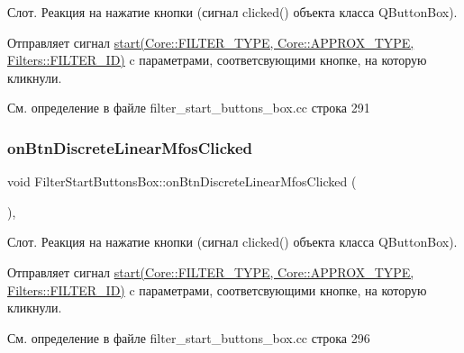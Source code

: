 Слот. Реакция на нажатие кнопки (сигнал clicked() объекта класса Q\+Button\+Box).

Отправляет сигнал \hyperlink{class_filter_start_buttons_box_ac6e2a6555f1d388391f188f834b8e753}{start(\+Core\+::\+F\+I\+L\+T\+E\+R\+\_\+\+T\+Y\+P\+E, Core\+::\+A\+P\+P\+R\+O\+X\+\_\+\+T\+Y\+P\+E, Filters\+::\+F\+I\+L\+T\+E\+R\+\_\+\+I\+D)} c параметрами, соответсвующими кнопке, на которую кликнули. 

См. определение в файле filter\+\_\+start\+\_\+buttons\+\_\+box.\+cc строка 291

\hypertarget{class_filter_start_buttons_box_ac200f7d204677620288463458a0d5dea}{}\label{class_filter_start_buttons_box_ac200f7d204677620288463458a0d5dea} 
\subsubsection{\texorpdfstring{on\+Btn\+Discrete\+Linear\+Mfos\+Clicked}{onBtnDiscreteLinearMfosClicked}}
{\footnotesize\ttfamily void Filter\+Start\+Buttons\+Box\+::on\+Btn\+Discrete\+Linear\+Mfos\+Clicked (\begin{DoxyParamCaption}{ }\end{DoxyParamCaption})\hspace{0.3cm}{\ttfamily [private]}, {\ttfamily [slot]}}

Слот. Реакция на нажатие кнопки (сигнал clicked() объекта класса Q\+Button\+Box).

Отправляет сигнал \hyperlink{class_filter_start_buttons_box_ac6e2a6555f1d388391f188f834b8e753}{start(\+Core\+::\+F\+I\+L\+T\+E\+R\+\_\+\+T\+Y\+P\+E, Core\+::\+A\+P\+P\+R\+O\+X\+\_\+\+T\+Y\+P\+E, Filters\+::\+F\+I\+L\+T\+E\+R\+\_\+\+I\+D)} c параметрами, соответсвующими кнопке, на которую кликнули. 

См. определение в файле filter\+\_\+start\+\_\+buttons\+\_\+box.\+cc строка 296

\hypertarget{class_filter_start_buttons_box_ac6e2a6555f1d388391f188f834b8e753}{}\label{class_filter_start_buttons_box_ac6e2a6555f1d388391f188f834b8e753} 
